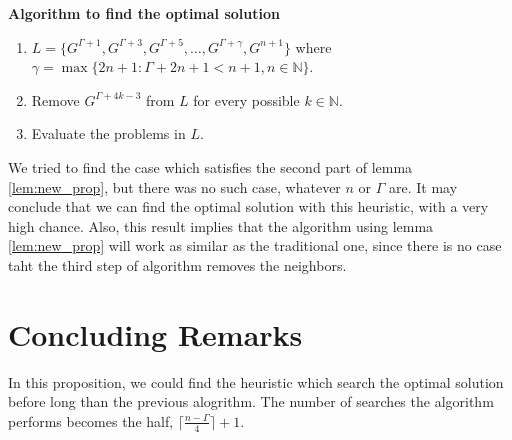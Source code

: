 \documentclass[letterpaper, 10pt]{article}
\begin{document}
\textbf{Algorithm to find the optimal solution}
\begin{enumerate}
	\item $L = \{ G^{\Gamma + 1}, G^{\Gamma + 3}, G^{\Gamma + 5}, \ldots, G^{\Gamma + \gamma}, G^{n+1} \}$ where $\gamma = \max\{{2n+1 : \Gamma + 2n + 1 < n+1, n \in \mathbb{N}} \}$.
	\item Remove $G^{\Gamma + 4k - 3}$ from $L$ for every possible $k \in \mathbb{N}$.
	\item Evaluate the problems in $L$.
\end{enumerate}
We tried to find the case which satisfies the second part of lemma \ref{lem:new_prop}, but there was no such case, whatever $n$ or $\Gamma$ are.
It may conclude that we can find the optimal solution with this heuristic, with a very high chance.
Also, this result implies that the algorithm using lemma \ref{lem:new_prop} will work as similar as the traditional one,
since there is no case taht the third step of algorithm removes the neighbors.

\section{Concluding Remarks}
In this proposition, we could find the heuristic which search the optimal solution before long than the previous alogrithm.
The number of searches the algorithm performs becomes the half, $\lceil \frac{n - \Gamma}{4} \rceil + 1$.





%


\end{document}
